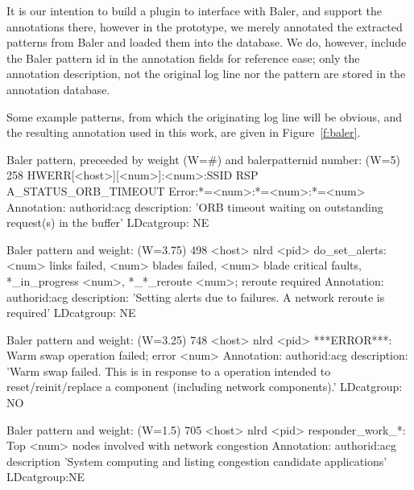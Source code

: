 It is our intention to
build a plugin to interface with Baler, and support the annotations there,
however in the prototype, we merely annotated the extracted patterns from
Baler and loaded them into the database.
We do, however, include the Baler pattern id in the annotation fields
for reference ease; only the annotation description, not the original log line nor the pattern
are stored in the annotation database.

Some example patterns, from which the originating log line will be obvious, and
the resulting annotation used in this work, are given in Figure~\ref{f:baler}.

\begin{figure*}
\begin{annol}

Baler pattern, preceeded by weight (W=#) and balerpatternid number:
(W=5)        258   HWERR[<host>][<num>]:<num>:SSID RSP A_STATUS_ORB_TIMEOUT Error:*=<num>:*=<num>:*=<num>
Annotation:
authorid:acg  description: 'ORB timeout waiting on outstanding request(s) in the buffer'  LDcatgroup: NE

Baler pattern and weight:
(W=3.75)     498   <host> nlrd <pid> do_set_alerts: <num> links failed, <num> blades failed, <num> blade critical faults, *_in_progress <num>, *_*_reroute <num>; reroute required
Annotation:
authorid:acg  description: 'Setting alerts due to failures. A network reroute is required' LDcatgroup: NE

Baler pattern and weight:
(W=3.25)     748   <host> nlrd <pid> ***ERROR***: Warm swap operation failed; error <num>
Annotation:
authorid:acg description: 'Warm swap failed. This is in response to a operation intended to reset/reinit/replace a component (including network components).' LDcatgroup: NO

Baler pattern and weight:
(W=1.5)      705   <host> nlrd <pid> responder_work_*: Top <num> nodes involved with network congestion
Annotation:
authorid:acg description 'System computing and listing congestion candidate applications' LDcatgroup:NE
\end{annol}
\caption{Example Baler patterns extracted from log lines and their annotated versions. Events to annotate are based on
knowledge of significant events. Annotation descriptions can provide additional context to non-self-explanatory log messages.}
\label{f:baler}
\end{figure*}



